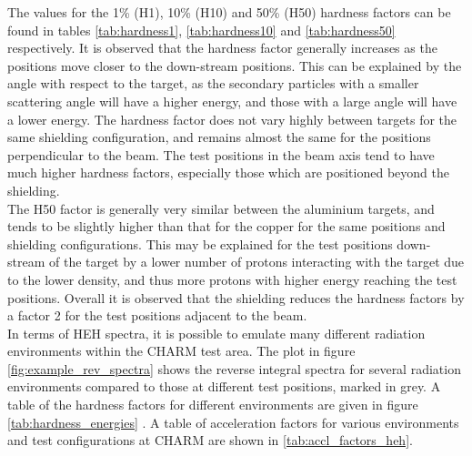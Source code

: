 The values for the 1\% (H1), 10\% (H10) and 50\% (H50) hardness factors can be found in tables \ref{tab:hardness1}, \ref{tab:hardness10} and \ref{tab:hardness50} respectively. It is observed that the hardness factor generally increases as the positions move closer to the down-stream positions. This can be explained by the angle with respect to the target, as the secondary particles with a smaller scattering angle will have a higher energy, and those with a large angle will have a lower energy. The hardness factor does not vary highly between targets for the same shielding configuration, and remains almost the same for the positions perpendicular to the beam. The test positions in the beam axis tend to have much higher hardness factors, especially those which are positioned beyond the shielding. \\

The H50 factor is generally very similar between the aluminium targets, and tends to be slightly higher than that for the copper for the same positions and shielding configurations. This may be explained for the test positions down-stream of the target by a lower number of protons interacting with the target due to the lower density, and thus more protons with higher energy reaching the test positions. Overall it is observed that the shielding reduces the hardness factors by a factor 2 for the test positions adjacent to the beam. \\

In terms of HEH spectra, it is possible to emulate many different radiation environments within the CHARM test area. The plot in figure \ref{fig:example_rev_spectra} shows the reverse integral spectra for several radiation environments compared to those at different test positions, marked in grey. A table of the hardness factors for different environments are given in figure \ref{tab:hardness_energies} \cite{radecs2014shortcourse}. A table of acceleration factors for various environments and test configurations at CHARM are shown in \ref{tab:accl_factors_heh}. \\

\newpage


